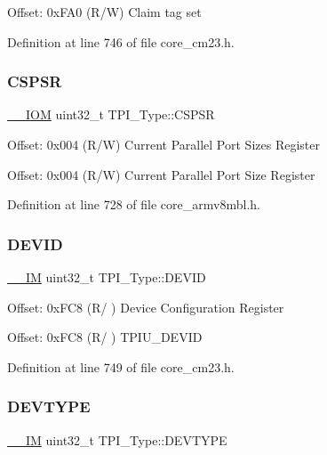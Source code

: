 Offset\+: 0x\+F\+A0 (R/W) Claim tag set 

Definition at line 746 of file core\+\_\+cm23.\+h.

\mbox{\label{struct_t_p_i___type_a8826aa84e5806053395a742d38d59d0f}} 
\subsubsection{\texorpdfstring{C\+S\+P\+SR}{CSPSR}}
{\footnotesize\ttfamily \hyperlink{core__sc300_8h_ab6caba5853a60a17e8e04499b52bf691}{\+\_\+\+\_\+\+I\+OM} uint32\+\_\+t T\+P\+I\+\_\+\+Type\+::\+C\+S\+P\+SR}

Offset\+: 0x004 (R/W) Current Parallel Port Sizes Register

Offset\+: 0x004 (R/W) Current Parallel Port Size Register 

Definition at line 728 of file core\+\_\+armv8mbl.\+h.

\mbox{\label{struct_t_p_i___type_abc0ecda8a5446bc754080276bad77514}} 
\subsubsection{\texorpdfstring{D\+E\+V\+ID}{DEVID}}
{\footnotesize\ttfamily \hyperlink{core__sc300_8h_a4cc1649793116d7c2d8afce7a4ffce43}{\+\_\+\+\_\+\+IM} uint32\+\_\+t T\+P\+I\+\_\+\+Type\+::\+D\+E\+V\+ID}

Offset\+: 0x\+F\+C8 (R/ ) Device Configuration Register

Offset\+: 0x\+F\+C8 (R/ ) T\+P\+I\+U\+\_\+\+D\+E\+V\+ID 

Definition at line 749 of file core\+\_\+cm23.\+h.

\mbox{\label{struct_t_p_i___type_ad98855854a719bbea33061e71529a472}} 
\subsubsection{\texorpdfstring{D\+E\+V\+T\+Y\+PE}{DEVTYPE}}
{\footnotesize\ttfamily \hyperlink{core__sc300_8h_a4cc1649793116d7c2d8afce7a4ffce43}{\+\_\+\+\_\+\+IM} uint32\+\_\+t T\+P\+I\+\_\+\+Type\+::\+D\+E\+V\+T\+Y\+PE}

